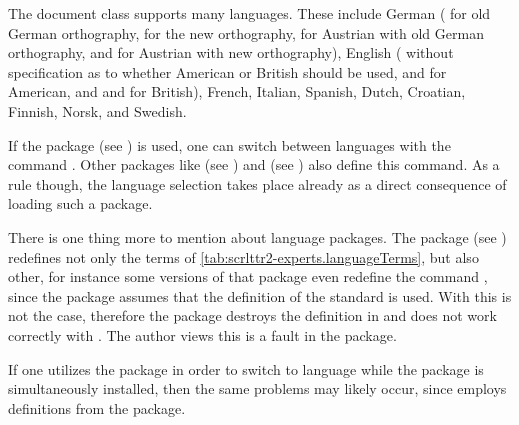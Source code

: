 The document class  supports many languages.  These include
German ( for old German orthography,
 for the new orthography,  for Austrian with
old German orthography, and
 for Austrian with new
orthography), English ( without
specification as to whether American or British should be used,
 and  for American, and 
and  for British), French,
Italian, Spanish,
Dutch, Croatian,
Finnish,
Norsk, and
Swedish.

If the package  (see
\cite{package:babel}) is used, one can switch between languages with
the command .  Other
packages like  (see
\cite{package:german}) and 
(see \cite{package:ngerman}) also define this command.  As a rule
though, the language selection takes place already as a direct
consequence of loading such a package. 
\iffalse%
Further information can be obtained in the documentation of the relevant
packages.
\fi

There is one thing more to mention about language
packages.  The package
 (see
\cite{package:french}) redefines not only the terms of
\autoref{tab:scrlttr2-experts.languageTerms}, but also other, for instance
some versions of that package even redefine the command
, since the package assumes that the definition
of the standard  is used.  With  this is not the
case, therefore the package  destroys the definition in
 and does not work correctly with \KOMAScript. The author
views this is a fault in the  package.

If one utilizes the  package in order to
switch to language  while the package
 is simultaneously installed, then the
same problems may likely occur, since  employs definitions
from the  package. 
%
\iffalse%
If the package \Package{french} is not
installed then there are no problems. Aimilarly, there is no problem if for
\Package{babel} instead of \PValue{french} other languages like
\PValue{acadian}, \PValue{canadien}, \PValue{francais} or \PValue{frenchb} are
chosen.
\fi

